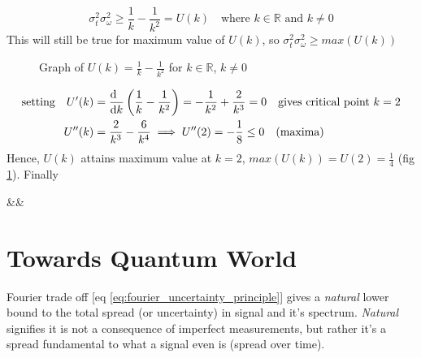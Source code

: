 \documentclass[11pt, a4paper]{article}
\let\oldsection\section
\renewcommand{\section}{%
	\setcounter{equation}{0}%
	\oldsection%
}
\newcommand{\quotedsingle}[1]{#1}	%
\newcommand{\quotedsingleit}[1]{\quotedsingle{\textit{#1}}}	%
\newcommand{\eqrefnp}[1]{\textup{\ref{#1}}}  %
\newcommand{\primed}[1]{#1^{\prime}}
\newcommand{\variance}[1]{\sigma_{#1}^{2}}
\newcommand{\stdev}[1]{\sigma_{#1}}
\newcommand{\diff}{\mathop{}\!\mathrm{d}}
\newcommand{\derv}[1]{\frac{\diff \hfill}{\diff #1}}	%
\newcommand{\dervb}[2]{\derv{#1} \left(#2\right)}  %
\begin{document}
	\begin{equation}
		\boxed{\variance{t} \variance{\omega} \geq \frac{1}{k} - \frac{1}{k^{2}} = U(k)} \quad \text{where } k \in \mathbb{R} \text{ and } k \neq 0
	\end{equation}
	This will still be true for maximum value of $U(k)$, so $\variance{t} \variance{\omega} \geq max(U(k))$
	\begin{figure}
		\centering
		\caption{Graph of $U(k) = \frac{1}{k} - \frac{1}{k^{2}}$ for $k \in \mathbb{R}$, $k \neq 0$}
		\label{fig:fourier_uncertainty_function}
	\end{figure}
	\begin{align*}
		\text{setting} \quad \primed{U}(k) & = \dervb{k}{\frac{1}{k} - \frac{1}{k^{2}}} = -\frac{1}{k^{2}} + \frac{2}{k^{3}} = 0 \quad \text{gives critical point } k = 2 \\
		U^{\prime \prime}(k) & = \frac{2}{k^{3}} - \frac{6}{k^{4}} \implies U^{\prime \prime}(2) = -\frac{1}{8} \leq 0 \quad \text{(maxima)}
	\end{align*}
	Hence, $U(k)$ attains maximum value at $k=2$, $max(U(k)) = U(2) = \frac{1}{4}$ (fig \ref{fig:fourier_uncertainty_function}). Finally
	\begin{flalign}\label{eq:fourier_uncertainty_principle}
		 \quad \boxed{\variance{t} \variance{\omega} \geq \frac{1}{4} \quad \text{or} \quad \stdev{t} \stdev{\omega} \geq \frac{1}{2}}&&
	\end{flalign}
	
	\section{Towards Quantum World}
	Fourier trade off [eq \eqrefnp{eq:fourier_uncertainty_principle}] gives a \textit{natural} lower bound to the total spread (or uncertainty) in signal and it's spectrum. \quotedsingleit{Natural} signifies it is not a consequence of imperfect measurements, but rather it's a spread fundamental to what a signal even is (spread over time). 
	
\end{document}
